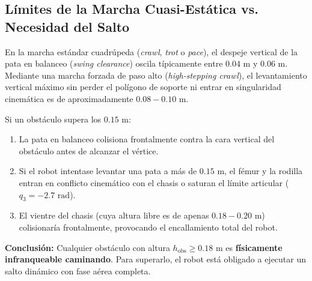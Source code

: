 \documentclass[11pt,a4paper]{article}
\begin{document}
\subsection{Límites de la Marcha Cuasi-Estática vs. Necesidad del Salto}
En la marcha estándar cuadrúpeda (\textit{crawl}, \textit{trot} o \textit{pace}), el despeje vertical de la pata en balanceo (\textit{swing clearance}) oscila típicamente entre $0.04\text{ m}$ y $0.06\text{ m}$. Mediante una marcha forzada de paso alto (\textit{high-stepping crawl}), el levantamiento vertical máximo sin perder el polígono de soporte ni entrar en singularidad cinemática es de aproximadamente $0.08 - 0.10\text{ m}$.

Si un obstáculo supera los $0.15\text{ m}$:
\begin{enumerate}
    \item La pata en balanceo colisiona frontalmente contra la cara vertical del obstáculo antes de alcanzar el vértice.
    \item Si el robot intentase levantar una pata a más de $0.15\text{ m}$, el fémur y la rodilla entran en conflicto cinemático con el chasis o saturan el límite articular ($q_3 = -2.7\text{ rad}$).
    \item El vientre del chasis (cuya altura libre es de apenas $0.18 - 0.20\text{ m}$) colisionaría frontalmente, provocando el encallamiento total del robot.
\end{enumerate}
\textbf{Conclusión:} Cualquier obstáculo con altura $h_{\text{obs}} \ge 0.18\text{ m}$ es \textbf{físicamente infranqueable caminando}. Para superarlo, el robot está obligado a ejecutar un salto dinámico con fase aérea completa.
\end{document}
